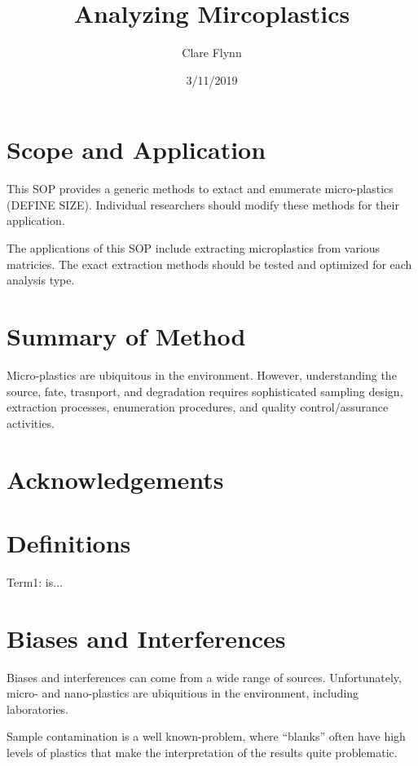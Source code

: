 \documentclass[12pt]{../SOP4_alpha}\usepackage[]{graphicx}\usepackage[]{color}
\title{Analyzing Mircoplastics}
\date{3/11/2019}
\author{Clare Flynn}
\begin{document}
\maketitle

\section{Scope and Application}

\NP This SOP provides a generic methods to extact and enumerate micro-plastics (DEFINE SIZE). Individual researchers should modify these methods for their application. 

\NP The applications of this SOP include extracting microplastics from various matricies. The exact extraction methods should be tested and optimized for each analysis type.

\section{Summary of Method}

\NP Micro-plastics are ubiquitous in the environment. However, understanding the source, fate, trasnport, and degradation requires sophisticated sampling design, extraction processes, enumeration procedures, and quality control/assurance activities. 

\tableofcontents

\newpage

\section{Acknowledgements}

\section{Definitions}

\NP Term1: is...

\section{Biases and Interferences}

\NP Biases and interferences can come from a wide range of sources. Unfortunately, micro- and nano-plastics are ubiquitious in the environment, including laboratories.

\NP Sample contamination is a well known-problem, where ``blanks'' often have high levels of plastics that make the interpretation of the results quite problematic. 
\end{document}
